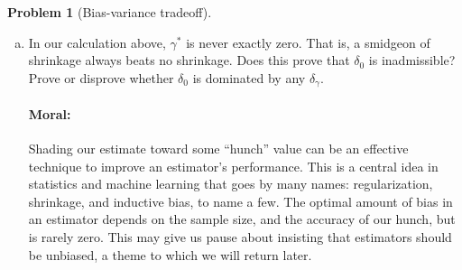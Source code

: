 \documentclass{article}
\theoremstyle{definition}
\newtheorem{problem}{Problem}
\begin{document}
\begin{problem}[Bias-variance tradeoff]
\begin{enumerate}[(a)]
  \item In our calculation above, $\gamma^*$ is never exactly zero. That is, a smidgeon of shrinkage always beats no shrinkage. Does this prove that $\delta_0$ is inadmissible? Prove or disprove whether $\delta_0$ is dominated by any $\delta_\gamma$.

\paragraph{Moral:} Shading our estimate toward some ``hunch'' value can be an effective technique to improve an estimator's performance. This is a central idea in statistics and machine learning that goes by many names: regularization, shrinkage, and inductive bias, to name a few. The optimal amount of bias in an estimator depends on the sample size, and the accuracy of our hunch, but is rarely zero. This may give us pause about insisting that estimators should be unbiased, a theme to which we will return later.

  \end{enumerate}
\end{problem}
\end{document}
